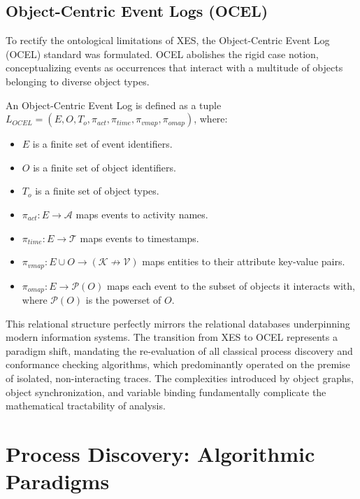 \subsection{Object-Centric Event Logs (OCEL)}
To rectify the ontological limitations of XES, the Object-Centric Event Log (OCEL) standard was formulated. OCEL abolishes the rigid case notion, conceptualizing events as occurrences that interact with a multitude of objects belonging to diverse object types.
\begin{definition}
An Object-Centric Event Log is defined as a tuple $L_{OCEL} = (E, O, T_o, \pi_{act}, \pi_{time}, \pi_{vmap}, \pi_{omap})$, where:
\begin{itemize}
    \item $E$ is a finite set of event identifiers.
    \item $O$ is a finite set of object identifiers.
    \item $T_o$ is a finite set of object types.
    \item $\pi_{act}: E \rightarrow \mathcal{A}$ maps events to activity names.
    \item $\pi_{time}: E \rightarrow \mathcal{T}$ maps events to timestamps.
    \item $\pi_{vmap}: E \cup O \rightarrow (\mathcal{K} \not\rightarrow \mathcal{V})$ maps entities to their attribute key-value pairs.
    \item $\pi_{omap}: E \rightarrow \mathcal{P}(O)$ maps each event to the subset of objects it interacts with, where $\mathcal{P}(O)$ is the powerset of $O$.
\end{itemize}
\end{definition}

This relational structure perfectly mirrors the relational databases underpinning modern information systems. The transition from XES to OCEL represents a paradigm shift, mandating the re-evaluation of all classical process discovery and conformance checking algorithms, which predominantly operated on the premise of isolated, non-interacting traces. The complexities introduced by object graphs, object synchronization, and variable binding fundamentally complicate the mathematical tractability of analysis.

\section{Process Discovery: Algorithmic Paradigms}
